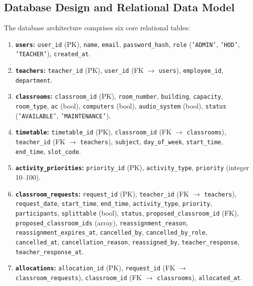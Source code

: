 \documentclass[conference]{IEEEtran}
\begin{document}
\subsection{Database Design and Relational Data Model}
The database architecture comprises six core relational tables:
\begin{enumerate}
    \item \textbf{\texttt{users}:} \texttt{user\_id} (PK), \texttt{name}, \texttt{email}, \texttt{password\_hash}, \texttt{role} (\texttt{'ADMIN'}, \texttt{'HOD'}, \texttt{'TEACHER'}), \texttt{created\_at}.
    \item \textbf{\texttt{teachers}:} \texttt{teacher\_id} (PK), \texttt{user\_id} (FK $\to$ \texttt{users}), \texttt{employee\_id}, \texttt{department}.
    \item \textbf{\texttt{classrooms}:} \texttt{classroom\_id} (PK), \texttt{room\_number}, \texttt{building}, \texttt{capacity}, \texttt{room\_type}, \texttt{ac} (bool), \texttt{computers} (bool), \texttt{audio\_system} (bool), \texttt{status} (\texttt{'AVAILABLE'}, \texttt{'MAINTENANCE'}).
    \item \textbf{\texttt{timetable}:} \texttt{timetable\_id} (PK), \texttt{classroom\_id} (FK $\to$ \texttt{classrooms}), \texttt{teacher\_id} (FK $\to$ \texttt{teachers}), \texttt{subject}, \texttt{day\_of\_week}, \texttt{start\_time}, \texttt{end\_time}, \texttt{slot\_code}.
    \item \textbf{\texttt{activity\_priorities}:} \texttt{priority\_id} (PK), \texttt{activity\_type}, \texttt{priority} (integer 10--100).
    \item \textbf{\texttt{classroom\_requests}:} \texttt{request\_id} (PK), \texttt{teacher\_id} (FK $\to$ \texttt{teachers}), \texttt{request\_date}, \texttt{start\_time}, \texttt{end\_time}, \texttt{activity\_type}, \texttt{priority}, \texttt{participants}, \texttt{splittable} (bool), \texttt{status}, \texttt{proposed\_classroom\_id} (FK), \texttt{proposed\_classroom\_ids} (array), \texttt{reassignment\_reason}, \texttt{reassignment\_expires\_at}, \texttt{cancelled\_by}, \texttt{cancelled\_by\_role}, \texttt{cancelled\_at}, \texttt{cancellation\_reason}, \texttt{reassigned\_by}, \texttt{teacher\_response}, \texttt{teacher\_response\_at}.
    \item \textbf{\texttt{allocations}:} \texttt{allocation\_id} (PK), \texttt{request\_id} (FK $\to$ \texttt{classroom\_requests}), \texttt{classroom\_id} (FK $\to$ \texttt{classrooms}), \texttt{allocated\_at}.
\end{enumerate}
\end{document}
